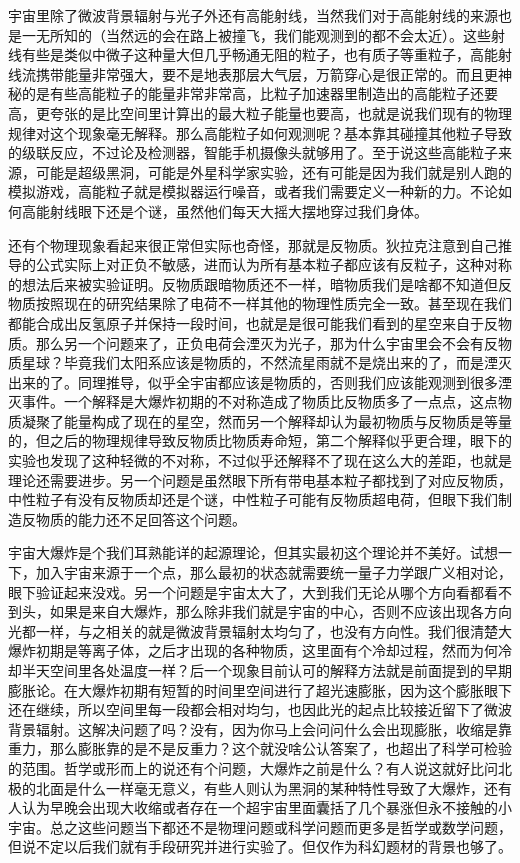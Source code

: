 \documentclass[]{book}
\begin{document}
宇宙里除了微波背景辐射与光子外还有高能射线，当然我们对于高能射线的来源也是一无所知的（当然远的会在路上被撞飞，我们能观测到的都不会太近）。这些射线有些是类似中微子这种量大但几乎畅通无阻的粒子，也有质子等重粒子，高能射线流携带能量非常强大，要不是地表那层大气层，万箭穿心是很正常的。而且更神秘的是有些高能粒子的能量非常非常高，比粒子加速器里制造出的高能粒子还要高，更夸张的是比空间里计算出的最大粒子能量也要高，也就是说我们现有的物理规律对这个现象毫无解释。那么高能粒子如何观测呢？基本靠其碰撞其他粒子导致的级联反应，不过论及检测器，智能手机摄像头就够用了。至于说这些高能粒子来源，可能是超级黑洞，可能是外星科学家实验，还有可能是因为我们就是别人跑的模拟游戏，高能粒子就是模拟器运行噪音，或者我们需要定义一种新的力。不论如何高能射线眼下还是个谜，虽然他们每天大摇大摆地穿过我们身体。

还有个物理现象看起来很正常但实际也奇怪，那就是反物质。狄拉克注意到自己推导的公式实际上对正负不敏感，进而认为所有基本粒子都应该有反粒子，这种对称的想法后来被实验证明。反物质跟暗物质还不一样，暗物质我们是啥都不知道但反物质按照现在的研究结果除了电荷不一样其他的物理性质完全一致。甚至现在我们都能合成出反氢原子并保持一段时间，也就是是很可能我们看到的星空来自于反物质。那么另一个问题来了，正负电荷会湮灭为光子，那为什么宇宙里会不会有反物质星球？毕竟我们太阳系应该是物质的，不然流星雨就不是烧出来的了，而是湮灭出来的了。同理推导，似乎全宇宙都应该是物质的，否则我们应该能观测到很多湮灭事件。一个解释是大爆炸初期的不对称造成了物质比反物质多了一点点，这点物质凝聚了能量构成了现在的星空，然而另一个解释却认为最初物质与反物质是等量的，但之后的物理规律导致反物质比物质寿命短，第二个解释似乎更合理，眼下的实验也发现了这种轻微的不对称，不过似乎还解释不了现在这么大的差距，也就是理论还需要进步。另一个问题是虽然眼下所有带电基本粒子都找到了对应反物质，中性粒子有没有反物质却还是个谜，中性粒子可能有反物质超电荷，但眼下我们制造反物质的能力还不足回答这个问题。

宇宙大爆炸是个我们耳熟能详的起源理论，但其实最初这个理论并不美好。试想一下，加入宇宙来源于一个点，那么最初的状态就需要统一量子力学跟广义相对论，眼下验证起来没戏。另一个问题是宇宙太大了，大到我们无论从哪个方向看都看不到头，如果是来自大爆炸，那么除非我们就是宇宙的中心，否则不应该出现各方向光都一样，与之相关的就是微波背景辐射太均匀了，也没有方向性。我们很清楚大爆炸初期是等离子体，之后才出现的各种物质，这里面有个冷却过程，然而为何冷却半天空间里各处温度一样？后一个现象目前认可的解释方法就是前面提到的早期膨胀论。在大爆炸初期有短暂的时间里空间进行了超光速膨胀，因为这个膨胀眼下还在继续，所以空间里每一段都会相对均匀，也因此光的起点比较接近留下了微波背景辐射。这解决问题了吗？没有，因为你马上会问问什么会出现膨胀，收缩是靠重力，那么膨胀靠的是不是反重力？这个就没啥公认答案了，也超出了科学可检验的范围。哲学或形而上的说还有个问题，大爆炸之前是什么？有人说这就好比问北极的北面是什么一样毫无意义，有些人则认为黑洞的某种特性导致了大爆炸，还有人认为早晚会出现大收缩或者存在一个超宇宙里面囊括了几个暴涨但永不接触的小宇宙。总之这些问题当下都还不是物理问题或科学问题而更多是哲学或数学问题，但说不定以后我们就有手段研究并进行实验了。但仅作为科幻题材的背景也够了。
\end{document}
